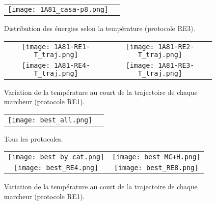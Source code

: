   \begin{figure}[t]
     \centering
     \begin{tabular}{cc}
       \texttt{[image: 1A81\_casa-p8.png]} &
     \end{tabular}
     
     \caption{Distribution des énergies selon la température (protocole RE3).}
\label{graph:Distrib_E_T}
   \end{figure}


   \begin{figure}[t]
     \centering
     \begin{tabular}{cc}
       \texttt{[image: 1A81-RE1-T\_traj.png]} &
       \texttt{[image: 1A81-RE2-T\_traj.png]} \\
       \texttt{[image: 1A81-RE4-T\_traj.png]} &
       \texttt{[image: 1A81-RE3-T\_traj.png]} \\
     \end{tabular}
     \caption{Variation de la température au court de la trajectoire de chaque marcheur (protocole RE1).}
\label{graph:TRAJ_T}
   \end{figure}

    \clearpage

   \begin{figure}[t]
     \centering
     \begin{tabular}{cc}
       \texttt{[image: best\_all.png]} \\
     \end{tabular}
     \caption{Tous les protocoles.}
\label{graph:best_ener_all_all}
   \end{figure}


    \clearpage


   \begin{figure}[t]
     \centering
     \begin{tabular}{cc}
       \texttt{[image: best\_by\_cat.png]} &
       \texttt{[image: best\_MC+H.png]} \\
       \texttt{[image: best\_RE4.png]} &
       \texttt{[image: best\_RE8.png]} \\
     \end{tabular}
     \caption{Variation de la température au court de la trajectoire de chaque marcheur (protocole RE1).}
\label{graph:best_ener_by_algo}
   \end{figure}


    \clearpage

